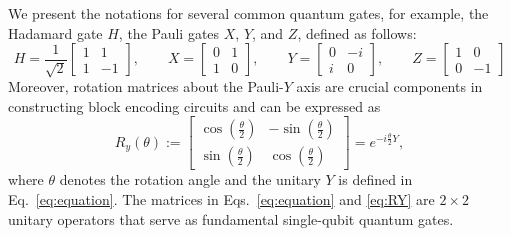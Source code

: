 \documentclass{article}
\begin{document}
    We present the notations for several common quantum gates, for example, the Hadamard gate $H$, the Pauli gates $X$, $Y$, and $Z$, defined as follows:
    \begin{equation}
        H = \frac{1}{\sqrt{2}}
        \begin{bmatrix}
            1 & 1  \\
            1 & -1
        \end{bmatrix}, \qquad
        X =
        \begin{bmatrix}
            0 & 1 \\
            1 & 0
        \end{bmatrix}, \qquad
        Y =
        \begin{bmatrix}
            0 & -i \\
            i & 0
        \end{bmatrix}, \qquad
        Z =
        \begin{bmatrix}
            1 & 0  \\
            0 & -1
        \end{bmatrix}\label{eq:equation}
    \end{equation}
    Moreover, rotation matrices about the Pauli-$Y$ axis are crucial components in constructing block encoding circuits and can be expressed as
    \begin{equation}
        R_y(\theta) :=
        \begin{bmatrix}
            \cos\left(\frac{\theta}{2}\right) & -\sin\left(\frac{\theta}{2}\right) \\
            \sin\left(\frac{\theta}{2}\right) & \cos\left(\frac{\theta}{2}\right)
        \end{bmatrix}
        = e^{-i \frac{\theta}{2} Y}, \tag{2.2} \label{eq:RY}
    \end{equation}
    where $\theta$ denotes the rotation angle and the unitary $Y$ is defined in Eq.~\eqref{eq:equation}. The matrices in Eqs.~\eqref{eq:equation} and \eqref{eq:RY} are $2 \times 2$ unitary operators that serve as fundamental single-qubit quantum gates.
\end{document}
